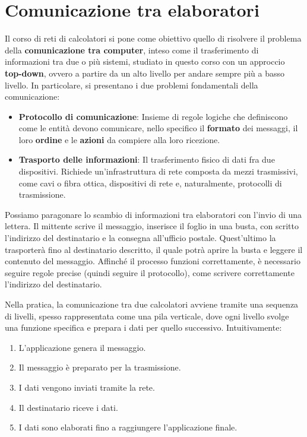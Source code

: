 \section{Comunicazione tra elaboratori}
Il corso di reti di calcolatori si pone come obiettivo quello di risolvere il problema della \textbf{comunicazione tra computer}, inteso come il
trasferimento di informazioni tra due o più sistemi, studiato in questo corso con un approccio \textbf{top-down}, ovvero a partire da un alto livello
per andare sempre più a basso livello. In particolare, si presentano i due problemi fondamentali della comunicazione: \begin{itemize}
	\item \textbf{Protocollo di comunicazione}: Insieme di regole logiche che definiscono come le entità devono comunicare, nello specifico il
	\textbf{formato} dei messaggi, il loro \textbf{ordine} e le \textbf{azioni} da compiere alla loro ricezione.
	\item \textbf{Trasporto delle informazioni}: Il trasferimento fisico di dati fra due dispositivi. Richiede un'infrastruttura di rete composta da
	mezzi trasmissivi, come cavi o fibra ottica, dispositivi di rete e, naturalmente, protocolli di trasmissione.
\end{itemize}
\noindent Possiamo paragonare lo scambio di informazioni tra elaboratori con l'invio di una lettera. Il mittente scrive il messaggio, inserisce il
foglio in una busta, con scritto l'indirizzo del destinatario e la consegna all'ufficio postale. Quest'ultimo la trasporterà fino al destinatario
descritto, il quale potrà aprire la busta e leggere il contenuto del messaggio. Affinché il processo funzioni correttamente, è necessario seguire regole
precise (quindi seguire il protocollo), come scrivere correttamente l'indirizzo del destinatario.\par
Nella pratica, la comunicazione tra due calcolatori avviene tramite una sequenza di livelli, spesso rappresentata come una pila verticale, dove ogni
livello svolge una funzione specifica e prepara i dati per quello successivo. Intuitivamente: \begin{enumerate}
	\item L'applicazione genera il messaggio.
	\item Il messaggio è preparato per la trasmissione.
	\item I dati vengono inviati tramite la rete.
	\item Il destinatario riceve i dati.
	\item I dati sono elaborati fino a raggiungere l'applicazione finale.
\end{enumerate}
